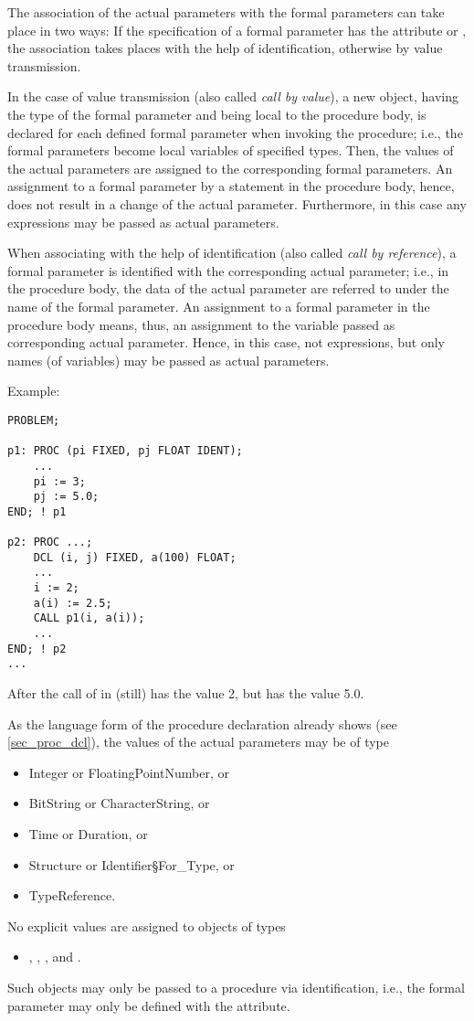 The association of the actual parameters with the formal parameters can
take place in two ways: If the specification of a formal parameter has
the attribute  or ,
the association takes places with the
help of identification, otherwise by value transmission.

In the case of value transmission (also called {\em call by value}), a
new object, having the type of the formal parameter and being local to
the procedure body, is declared for each defined formal parameter when
invoking the procedure; i.e., the formal parameters become local
variables of specified types. Then, the values of the actual parameters
are assigned to the corresponding formal parameters. An assignment to a
formal parameter by a statement in the procedure body, hence, does not
result in a change of the actual parameter. Furthermore, in this case
any expressions may be passed as actual parameters.

When associating with the help of identification (also called {\em call
by reference}), a formal parameter is identified with the corresponding
actual parameter; i.e., in the procedure body, the data of the actual
parameter are referred to under the name of the formal parameter. An
assignment to a formal parameter in the procedure body means, thus, an
assignment to the variable passed as corresponding actual parameter.
Hence, in this case, not expressions, but only names (of variables) may
be passed as actual parameters.

Example:

\begin{lstlisting}
PROBLEM;
 
p1: PROC (pi FIXED, pj FLOAT IDENT);
    ... 
    pi := 3;
    pj := 5.0;
END; ! p1

p2: PROC ...;
    DCL (i, j) FIXED, a(100) FLOAT;
    ... 
    i := 2;
    a(i) := 2.5; 
    CALL p1(i, a(i));
    ... 
END; ! p2
... 
\end{lstlisting}

After the call of  in   (still) has the value 2,
 but  has the
value 5.0.

As the language form of the procedure declaration already shows (see
\ref{sec_proc_dcl}), the values of the actual parameters may be of type
\begin{itemize}
\item Integer or FloatingPointNumber, or
\item BitString or CharacterString, or
\item Time or Duration, or
\item Structure or Identifier\S For\_Type, or
\item TypeReference.
\end{itemize}
No explicit values are assigned to objects of types
\begin{itemize}
\item {}, , ,  and .
\end{itemize}
Such objects may only be passed to a procedure via identification, i.e.,
the formal parameter may only be defined with the  attribute.

